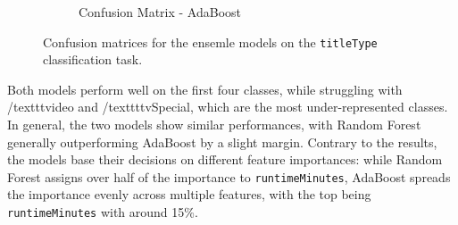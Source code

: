 \begin{figure}[H]
\begin{subfigure}[b]{0.49\textwidth}
        \caption{Confusion Matrix - AdaBoost}
        \label{fig:cm_ab}
    \end{subfigure}
    \caption{Confusion matrices for the ensemle models on the \texttt{titleType} classification task.}
    \label{fig:cm_comparison}
\end{figure}
Both models perform well on the first four classes, while struggling
with /texttt{video} and /texttt{tvSpecial}, which are the most
under-represented classes. In general, the two models show similar
performances, with Random Forest generally outperforming AdaBoost
by a slight margin.
Contrary to the results, the models base their decisions
on different feature importances: while Random Forest assigns over
half of the importance to \texttt{runtimeMinutes},
AdaBoost spreads the importance evenly across multiple features,
with the top being \texttt{runtimeMinutes} with around 15\%.


